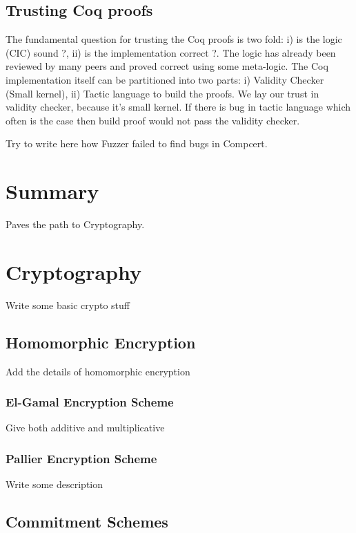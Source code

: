   
 
  

 
 \subsection{Trusting Coq proofs}
  The fundamental question for trusting the Coq proofs is two fold: 
  i) is the logic (CIC) sound ?, ii) is the implementation correct ?. 
  The logic has already been reviewed by many peers and proved correct 
  using some meta-logic. The 
  Coq implementation itself can be partitioned into two parts: 
  i) Validity Checker (Small kernel), 
  ii) Tactic language to build the proofs.
  We lay our trust in validity checker, because it's small kernel. If there
  is bug in tactic language which often is the case then build proof would 
  not pass the validity checker.  
  
  Try to write here how Fuzzer failed to find bugs in Compcert. 
  
\section{Summary} 
  Paves the path to Cryptography. 
    
\section{Cryptography}
    Write some basic crypto stuff
    
    \subsection{Homomorphic Encryption}
     Add the details of 
     homomorphic encryption 
     \subsubsection{El-Gamal Encryption Scheme}
        Give both additive and multiplicative
     \subsubsection{Pallier Encryption Scheme}
        Write some description
     \subsection{Commitment Schemes}   
